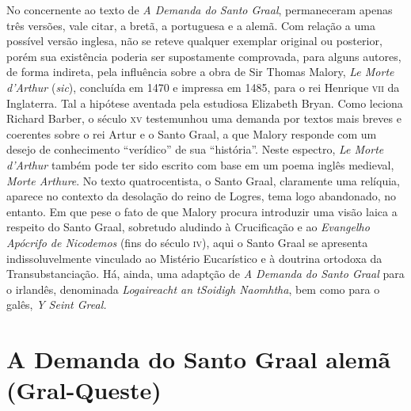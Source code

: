 No concernente ao texto de \textit{A Demanda do Santo Graal},
permaneceram apenas três versões, vale citar, a bretã, a portuguesa e a
alemã. Com relação a uma possível versão inglesa, não se reteve
qualquer exemplar original ou posterior, porém sua existência poderia
ser supostamente comprovada, para alguns autores, de forma indireta,
pela influência sobre a obra de Sir Thomas Malory, \textit{Le Morte
d’Arthur} (\textit{sic}), concluída em 1470 e impressa em 1485, para o
rei Henrique \textsc{vii} da Inglaterra. Tal a hipótese aventada pela estudiosa
Elizabeth Bryan. Como leciona Richard Barber, o século \textsc{xv} testemunhou
uma demanda por textos mais breves e coerentes sobre o rei Artur e o
Santo Graal, a que Malory responde com um desejo de conhecimento
“verídico” de sua “história”. Neste espectro, \textit{Le Morte
d’Arthur} também pode ter sido escrito com base em um poema inglês
medieval, \textit{Morte Arthure}. No texto quatrocentista, o Santo
Graal, claramente uma relíquia, aparece no contexto da desolação do
reino de Logres, tema logo abandonado, no entanto. Em que pese o fato
de que Malory procura introduzir uma visão laica a respeito do Santo
Graal, sobretudo aludindo à Crucificação e ao \textit{Evangelho
Apócrifo de Nicodemos} (fins do século \textsc{iv}), aqui o Santo Graal se
apresenta indissoluvelmente vinculado ao Mistério Eucarístico e à
doutrina ortodoxa da Transubstanciação.  Há, ainda, uma adaptção de
\textit{A Demanda do Santo Graal}  para o irlandês, denominada
\textit{Logaireacht an tSoidigh Naomhtha}, bem como para o galês,
\textit{Y Seint Greal.}

\section{A Demanda do Santo Graal alemã (Gral-Queste)}

